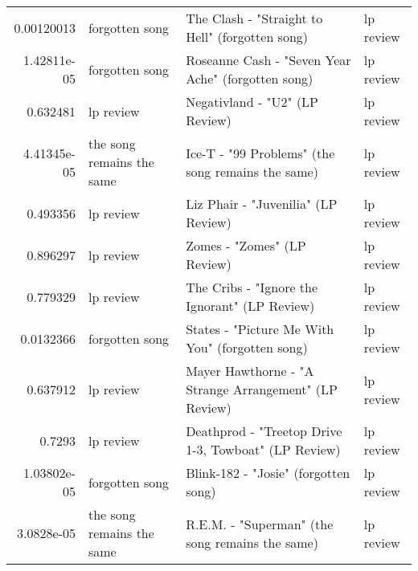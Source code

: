 \documentclass[letterpaper,10pt]{article}
\begin{document}
\begin{table}[H]
\begin{adjustbox}{max width=\linewidth}
\begin{tabular}{rlll}
  0.00120013  & forgotten song            & The Clash - "Straight to Hell" (forgotten song)                                                              & lp review                 \\
  1.42811e-05 & forgotten song            & Roseanne Cash - "Seven Year Ache" (forgotten song)                                                           & lp review                 \\
  0.632481    & lp review                 & Negativland - "U2" (LP Review)                                                                               & lp review                 \\
  4.41345e-05 & the song remains the same & Ice-T - "99 Problems" (the song remains the same)                                                            & lp review                 \\
  0.493356    & lp review                 & Liz Phair - "Juvenilia" (LP Review)                                                                          & lp review                 \\
  0.896297    & lp review                 & Zomes - "Zomes" (LP Review)                                                                                  & lp review                 \\
  0.779329    & lp review                 & The Cribs - "Ignore the Ignorant" (LP Review)                                                                & lp review                 \\
  0.0132366   & forgotten song            & States - "Picture Me With You" (forgotten song)                                                              & lp review                 \\
  0.637912    & lp review                 & Mayer Hawthorne - "A Strange Arrangement" (LP Review)                                                        & lp review                 \\
  0.7293      & lp review                 & Deathprod - "Treetop Drive 1-3, Towboat" (LP Review)                                                         & lp review                 \\
  1.03802e-05 & forgotten song            & Blink-182 - "Josie" (forgotten song)                                                                         & lp review                 \\
  3.0828e-05  & the song remains the same & R.E.M. - "Superman" (the song remains the same)                                                              & lp review                 \\

\end{tabular}
\end{adjustbox}
\end{table}
\end{document}

